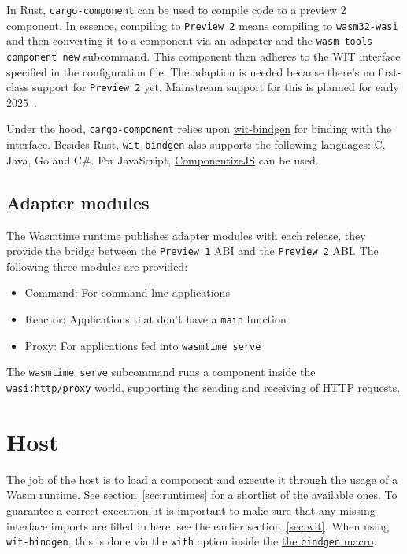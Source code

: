 In Rust, \texttt{cargo-component} can be used to compile code to a preview 2 component. In essence, compiling to \texttt{Preview 2} means compiling to \texttt{wasm32-wasi} and then converting it to a component via an adapater and the \texttt{wasm-tools component new} subcommand. This component then adheres to the \gls{WIT} interface specified in the configuration file. The adaption is needed because there's no first-class support for \texttt{Preview 2} yet. Mainstream support for this is planned for early 2025~\cite{rust:p2}.

Under the hood, \texttt{cargo-component} relies upon \href{https://github.com/bytecodealliance/wit-bindgen}{wit-bindgen} for binding with the interface. Besides Rust, \texttt{wit-bindgen} also supports the following languages: C, Java, Go and C\#. For JavaScript, \href{https://github.com/bytecodealliance/ComponentizeJS}{ComponentizeJS} can be used.

\subsection{Adapter modules}

The Wasmtime runtime publishes adapter modules with each release, they provide the bridge between the \texttt{Preview 1} \gls{ABI} and the \texttt{Preview 2} \gls{ABI}. The following three modules are provided:

\begin{itemize}
    \item Command: For command-line applications
    \item Reactor: Applications that don't have a \texttt{main} function
    \item Proxy: For applications fed into \texttt{wasmtime serve}
\end{itemize}

The \texttt{wasmtime serve} subcommand runs a component inside the \texttt{wasi:http/proxy} world, supporting the sending and receiving of HTTP requests.

\section{Host}
\label{sec:host}

The job of the host is to load a component and execute it through the usage of a \gls{Wasm} runtime. See section~\ref{sec:runtimes} for a shortlist of the available ones. To guarantee a correct execution, it is important to make sure that any missing interface imports are filled in here, see the earlier section~\ref{sec:wit}. When using \texttt{wit-bindgen}, this is done via the \texttt{with} option inside the \href{https://docs.rs/wasmtime/latest/wasmtime/component/macro.bindgen.html}{the \texttt{bindgen} macro}.

